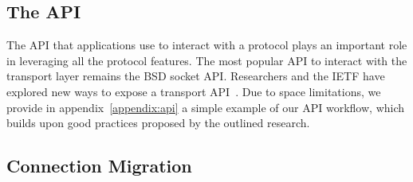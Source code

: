 
\subsection{The \tcpls API}


The API that applications use to interact with a protocol plays an important
role in leveraging all the protocol features. The most popular
API to interact with the transport layer remains the BSD socket API. Researchers
and the IETF have explored new ways to expose a transport
API~\cite{draft-ietf-taps-arch,hruby2014sockets,rfc6458,schmidt2013socket}.
Due to space limitations, we provide in appendix~\ref{appendix:api} a simple example of our API workflow,
which builds upon good practices proposed by the outlined research.




\subsection{Connection Migration}

